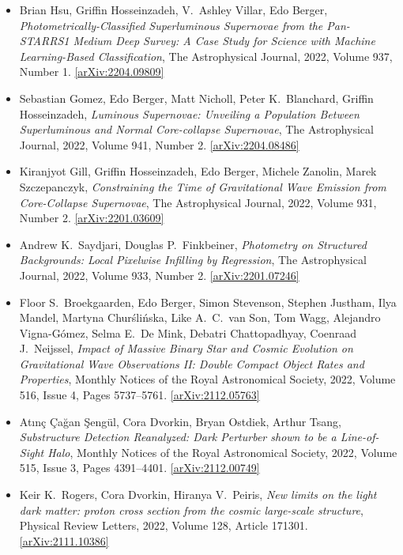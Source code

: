 \begin{itemize}
\item Brian Hsu, Griffin Hosseinzadeh, V.\  Ashley Villar, Edo Berger, \textit{Photometrically-Classified Superluminous Supernovae from the Pan-STARRS1 Medium Deep Survey: A Case Study for Science with Machine Learning-Based Classification}, The Astrophysical Journal, 2022, Volume 937, Number 1. \href{https://arxiv.org/abs/2204.09809}{[arXiv:2204.09809]} 
\item Sebastian Gomez, Edo Berger, Matt Nicholl, Peter K.\  Blanchard, Griffin Hosseinzadeh, \textit{Luminous Supernovae: Unveiling a Population Between Superluminous and Normal Core-collapse Supernovae}, The Astrophysical Journal, 2022, Volume 941, Number 2. \href{https://arxiv.org/abs/2204.08486}{[arXiv:2204.08486]} 
\item Kiranjyot Gill, Griffin Hosseinzadeh, Edo Berger, Michele Zanolin, Marek Szczepanczyk, \textit{Constraining the Time of Gravitational Wave Emission from Core-Collapse Supernovae}, The Astrophysical Journal, 2022, Volume 931, Number 2. \href{https://arxiv.org/abs/2201.03609}{[arXiv:2201.03609]} 
\item Andrew K.\  Saydjari, Douglas P.\  Finkbeiner, \textit{Photometry on Structured Backgrounds: Local Pixelwise Infilling by Regression}, The Astrophysical Journal, 2022, Volume 933, Number 2. \href{https://arxiv.org/abs/2201.07246}{[arXiv:2201.07246]} 
\item Floor S.\  Broekgaarden, Edo Berger, Simon Stevenson, Stephen Justham, Ilya Mandel, Martyna Churślińska, Like A.\  C.\  van Son, Tom Wagg, Alejandro Vigna-Gómez, Selma E.\  De Mink, Debatri Chattopadhyay, Coenraad J.\  Neijssel, \textit{Impact of Massive Binary Star and Cosmic Evolution on Gravitational Wave Observations II: Double Compact Object Rates and Properties}, Monthly Notices of the Royal Astronomical Society, 2022, Volume 516, Issue 4, Pages 5737–5761. \href{https://arxiv.org/abs/2112.05763}{[arXiv:2112.05763]} 
\item Atınç Çağan Şengül, Cora Dvorkin, Bryan Ostdiek, Arthur Tsang, \textit{Substructure Detection Reanalyzed: Dark Perturber shown to be a Line-of-Sight Halo}, Monthly Notices of the Royal Astronomical Society, 2022, Volume 515, Issue 3, Pages 4391–4401. \href{https://arxiv.org/abs/2112.00749}{[arXiv:2112.00749]} 
\item Keir K.\  Rogers, Cora Dvorkin, Hiranya V.\  Peiris, \textit{New limits on the light dark matter: proton cross section from the cosmic large-scale structure}, Physical Review Letters, 2022, Volume 128, Article 171301. \href{https://arxiv.org/abs/2111.10386}{[arXiv:2111.10386]} 

\end{itemize}
